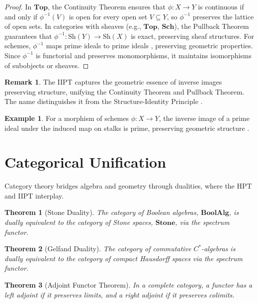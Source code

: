 \documentclass{article}
\theoremstyle{plain}
\newtheorem{theorem}{Theorem}
\theoremstyle{definition}
\newtheorem{example}{Example}
\newtheorem{remark}{Remark}
\begin{document}
\begin{proof}
In \(\mathbf{Top}\), the Continuity Theorem \cite{munkres} ensures that \(\phi: X \to Y\) is continuous if and only if \(\phi^{-1}(V)\) is open for every open set \(V \subseteq Y\), so \(\phi^{-1}\) preserves the lattice of open sets. In categories with sheaves (e.g., \(\mathbf{Top}\), \(\mathbf{Sch}\)), the Pullback Theorem \cite{kashiwara} guarantees that \(\phi^{-1}: \text{Sh}(Y) \to \text{Sh}(X)\) is exact, preserving sheaf structures. For schemes, \(\phi^{-1}\) maps prime ideals to prime ideals \cite{hart}, preserving geometric properties. Since \(\phi^{-1}\) is functorial and preserves monomorphisms, it maintains isomorphisms of subobjects or sheaves.
\end{proof}

\begin{remark}
The IIPT captures the geometric essence of inverse images preserving structure, unifying the Continuity Theorem and Pullback Theorem. The name distinguishes it from the Structure-Identity Principle \cite{mac}.
\end{remark}

\begin{example}
For a morphism of schemes \(\phi: X \to Y\), the inverse image of a prime ideal under the induced map on stalks is prime, preserving geometric structure \cite{hart}.
\end{example}

\section{Categorical Unification}
Category theory bridges algebra and geometry through dualities, where the HPT and IIPT interplay.

\begin{theorem}[Stone Duality]
The category of Boolean algebras, \(\mathbf{BoolAlg}\), is dually equivalent to the category of Stone spaces, \(\mathbf{Stone}\), via the spectrum functor.
\end{theorem}

\begin{theorem}[Gelfand Duality]
The category of commutative \(C^*\)-algebras is dually equivalent to the category of compact Hausdorff spaces via the spectrum functor.
\end{theorem}

\begin{theorem}[Adjoint Functor Theorem]
In a complete category, a functor has a left adjoint if it preserves limits, and a right adjoint if it preserves colimits.
\end{theorem}
\end{document}
